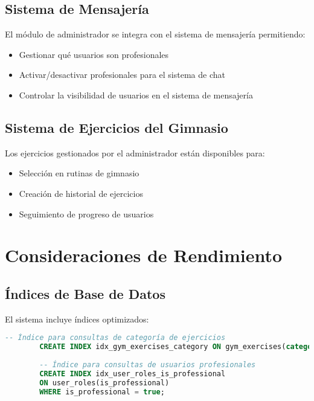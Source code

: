 \documentclass[12pt,a4paper]{article}
\begin{document}
	\subsection{Sistema de Mensajería}
	
	El módulo de administrador se integra con el sistema de mensajería permitiendo:
	
	\begin{itemize}
		\item Gestionar qué usuarios son profesionales
		\item Activar/desactivar profesionales para el sistema de chat
		\item Controlar la visibilidad de usuarios en el sistema de mensajería
	\end{itemize}
	
	\subsection{Sistema de Ejercicios del Gimnasio}
	
	Los ejercicios gestionados por el administrador están disponibles para:
	
	\begin{itemize}
		\item Selección en rutinas de gimnasio
		\item Creación de historial de ejercicios
		\item Seguimiento de progreso de usuarios
	\end{itemize}
	
	\section{Consideraciones de Rendimiento}
	
	\subsection{Índices de Base de Datos}
	
	El sistema incluye índices optimizados:
	
	\begin{lstlisting}[language=SQL, caption=Índices para optimización]
		-- Índice para consultas de categoría de ejercicios
		CREATE INDEX idx_gym_exercises_category ON gym_exercises(category);
		
		-- Índice para consultas de usuarios profesionales
		CREATE INDEX idx_user_roles_is_professional 
		ON user_roles(is_professional) 
		WHERE is_professional = true;
	\end{lstlisting}
	
\end{document}
